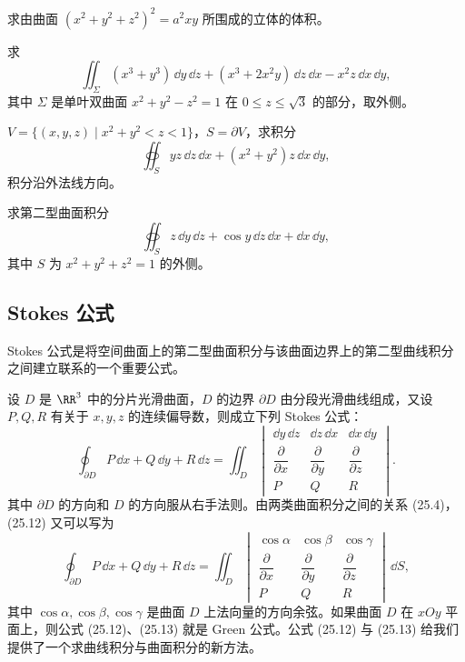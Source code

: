 \begin{xexercise}[4]
求由曲面 $(x^2+y^2+z^2)^2=a^2xy$ 所围成的立体的体积。
\end{xexercise}

\begin{xexercise}[5]
求
\[
  \iint_\Sigma(x^3+y^3)\,\dd y\,\dd z+(x^3+2x^2y)\,\dd z\,\dd x-x^2z\,\dd x\,\dd y,
\]
其中 $\Sigma$ 是单叶双曲面 $x^2+y^2-z^2=1$ 在 $0\le z\le\sqrt3$ 的部分，取外侧。
\end{xexercise}

\begin{xexercise}[6]
$V=\{(x,y,z)\mid x^2+y^2<z<1\}$，$S=\partial V$，求积分
\[
  \oiint_S yz\,\dd z\,\dd x+(x^2+y^2)z\,\dd x\,\dd y,
\]
积分沿外法线方向。
\end{xexercise}

\begin{xexercise}[7]
求第二型曲面积分
\[
  \oiint_S z\,\dd y\,\dd z+\cos y\,\dd z\,\dd x+\dd x\,\dd y,
\]
其中 $S$ 为 $x^2+y^2+z^2=1$ 的外侧。
\end{xexercise}

\subsection{Stokes 公式}

Stokes 公式是将空间曲面上的第二型曲面积分与该曲面边界上的第二型曲线积分之间建立联系的一个重要公式。

设 $D$ 是 $\RR^3$ 中的分片光滑曲面，$D$ 的边界 $\partial D$ 由分段光滑曲线组成，又设 $P,Q,R$ 有关于 $x,y,z$ 的连续偏导数，则成立下列 Stokes 公式：
\begin{equation}
  \oint_{\partial D}P\,\dd x+Q\,\dd y+R\,\dd z
  =\iint_D
  \begin{vmatrix}
  \dd y\,\dd z&\dd z\,\dd x&\dd x\,\dd y\\
  \dfrac\partial{\partial x}&\dfrac\partial{\partial y}&\dfrac\partial{\partial z}\\
  P&Q&R
  \end{vmatrix}.
  \tag{25.12}
\end{equation}
其中 $\partial D$ 的方向和 $D$ 的方向服从右手法则。由两类曲面积分之间的关系 (25.4)，(25.12) 又可以写为
\begin{equation}
  \oint_{\partial D}P\,\dd x+Q\,\dd y+R\,\dd z
  =\iint_D
  \begin{vmatrix}
  \cos\alpha&\cos\beta&\cos\gamma\\
  \dfrac\partial{\partial x}&\dfrac\partial{\partial y}&\dfrac\partial{\partial z}\\
  P&Q&R
  \end{vmatrix}\,\dd S,
  \tag{25.13}
\end{equation}
其中 $\cos\alpha,\cos\beta,\cos\gamma$ 是曲面 $D$ 上法向量的方向余弦。如果曲面 $D$ 在 $xOy$ 平面上，则公式 (25.12)、(25.13) 就是 Green 公式。公式 (25.12) 与 (25.13) 给我们提供了一个求曲线积分与曲面积分的新方法。

